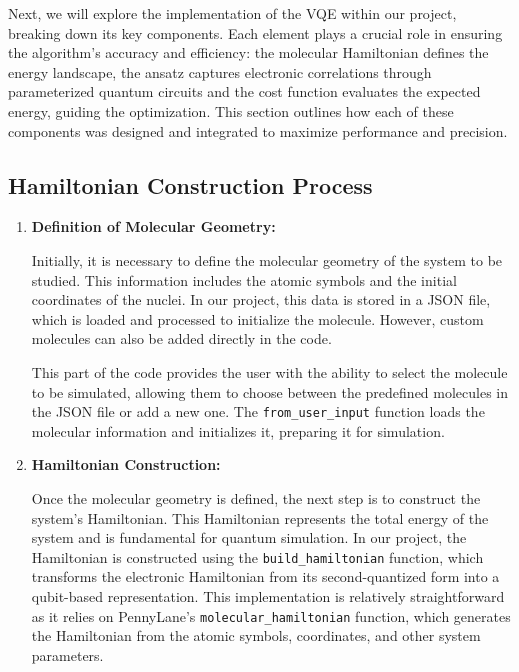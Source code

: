 Next, we will explore the implementation of the VQE within our project, breaking down its key components. Each element plays a crucial role in ensuring the algorithm's accuracy and efficiency: the molecular Hamiltonian defines the energy landscape, the ansatz captures electronic correlations through parameterized quantum circuits and the cost function evaluates the expected energy, guiding the optimization. This section outlines how each of these components was designed and integrated to maximize performance and precision.

\subsection{Hamiltonian Construction Process}

\begin{enumerate}
    \item \textbf{Definition of Molecular Geometry:}

    Initially, it is necessary to define the molecular geometry of the system to be studied. This information includes the atomic symbols and the initial coordinates of the nuclei. In our project, this data is stored in a JSON file, which is loaded and processed to initialize the molecule. However, custom molecules can also be added directly in the code. 

    This part of the code provides the user with the ability to select the molecule to be simulated, allowing them to choose between the predefined molecules in the JSON file or add a new one. The \texttt{from\_user\_input} function loads the molecular information and initializes it, preparing it for simulation.

    \item \textbf{Hamiltonian Construction:}

    Once the molecular geometry is defined, the next step is to construct the system's Hamiltonian. This Hamiltonian represents the total energy of the system and is fundamental for quantum simulation. In our project, the Hamiltonian is constructed using the \texttt{build\_hamiltonian} function, which transforms the electronic Hamiltonian from its second-quantized form into a qubit-based representation. This implementation is relatively straightforward as it relies on PennyLane's \texttt{molecular\_hamiltonian} function, which generates the Hamiltonian from the atomic symbols, coordinates, and other system parameters.


\end{enumerate}
